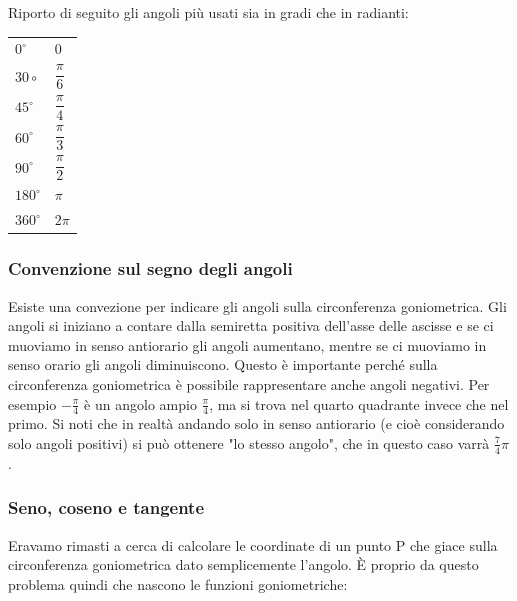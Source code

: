 Riporto di seguito gli angoli più usati sia in gradi che in radianti:
\begin{table}[H]
\centering
\bgroup
\def\arraystretch{2}%
\begin{tabular}{l|l}
$0^\circ$                                  & $0$             \\
$30\circ$                                  & $\dfrac{\pi}{6}$ \\
$45^\circ$                                 & $\dfrac{\pi}{4}$ \\
$60^\circ$                                 & $\dfrac{\pi}{3}$ \\
$90^\circ$                                 & $\dfrac{\pi}{2}$ \\
$180^\circ$                                & $\pi$           \\
$360^\circ$                                & $2\pi$         
\end{tabular}
\egroup
\end{table}

\subsubsection{Convenzione sul segno degli angoli}
Esiste una convezione per indicare gli angoli sulla circonferenza goniometrica. Gli angoli si iniziano a contare dalla semiretta positiva dell'asse delle ascisse e se ci muoviamo in senso antiorario gli angoli aumentano, mentre se ci muoviamo in senso orario gli angoli diminuiscono. Questo è importante perché sulla circonferenza goniometrica è possibile rappresentare anche angoli negativi. Per esempio $-\frac{\pi}{4}$ è un angolo ampio $\frac{\pi}{4}$, ma si trova nel quarto quadrante invece che nel primo. Si noti che in realtà andando solo in senso antiorario (e cioè considerando solo angoli positivi) si può ottenere "lo stesso angolo", che in questo caso varrà $\frac{7}{4}\pi$. %

\subsubsection{Seno, coseno e tangente}
Eravamo rimasti a cerca di calcolare le coordinate di un punto P che giace sulla circonferenza goniometrica dato semplicemente l'angolo. È proprio da questo problema quindi che nascono le funzioni goniometriche:

